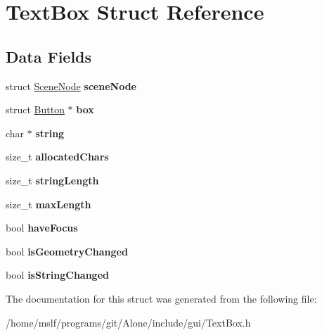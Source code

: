 \hypertarget{struct_text_box}{}\section{Text\+Box Struct Reference}
\label{struct_text_box}
\subsection*{Data Fields}
\begin{DoxyCompactItemize}
\item 
\hypertarget{struct_text_box_aca8025f56fb4ce20b974ec9a3292a9e4}{}\label{struct_text_box_aca8025f56fb4ce20b974ec9a3292a9e4} 
struct \hyperlink{struct_scene_node}{Scene\+Node} {\bfseries scene\+Node}
\item 
\hypertarget{struct_text_box_a548acc7030d1ae8d0b510cc513e4130e}{}\label{struct_text_box_a548acc7030d1ae8d0b510cc513e4130e} 
struct \hyperlink{struct_button}{Button} $\ast$ {\bfseries box}
\item 
\hypertarget{struct_text_box_aed1cfb225a5fb77461e7972691e68a72}{}\label{struct_text_box_aed1cfb225a5fb77461e7972691e68a72} 
char $\ast$ {\bfseries string}
\item 
\hypertarget{struct_text_box_a7c9905d1a530f3eed43ee1f2a172f5fb}{}\label{struct_text_box_a7c9905d1a530f3eed43ee1f2a172f5fb} 
size\+\_\+t {\bfseries allocated\+Chars}
\item 
\hypertarget{struct_text_box_a1db9ad026f0a1b2c4d79cb863e2dfd10}{}\label{struct_text_box_a1db9ad026f0a1b2c4d79cb863e2dfd10} 
size\+\_\+t {\bfseries string\+Length}
\item 
\hypertarget{struct_text_box_a304337cd03cb35fff8d419d0a085eac6}{}\label{struct_text_box_a304337cd03cb35fff8d419d0a085eac6} 
size\+\_\+t {\bfseries max\+Length}
\item 
\hypertarget{struct_text_box_ad15d64ccb6e24fbcf40345ac7a4b1230}{}\label{struct_text_box_ad15d64ccb6e24fbcf40345ac7a4b1230} 
bool {\bfseries have\+Focus}
\item 
\hypertarget{struct_text_box_a8ea7e8ac3e3330830aa7a4309390f3ac}{}\label{struct_text_box_a8ea7e8ac3e3330830aa7a4309390f3ac} 
bool {\bfseries is\+Geometry\+Changed}
\item 
\hypertarget{struct_text_box_a1c6db9813ce047719bb6c91e0c161240}{}\label{struct_text_box_a1c6db9813ce047719bb6c91e0c161240} 
bool {\bfseries is\+String\+Changed}
\end{DoxyCompactItemize}


The documentation for this struct was generated from the following file\+:\begin{DoxyCompactItemize}
\item 
/home/mslf/programs/git/\+Alone/include/gui/Text\+Box.\+h\end{DoxyCompactItemize}
